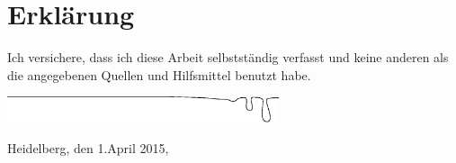 \onecolumn

\chapter*{Erkl\"{a}rung}

Ich versichere, dass ich diese Arbeit selbstst\"{a}ndig verfasst und keine anderen als die angegebenen Quellen und Hilfsmittel benutzt habe.

\vspace{2cm}
\hspace{4.5cm}
\includegraphics[width=0.6\textwidth]{./plot/sign_line.eps}

\vspace{-1.35cm}
Heidelberg, den 1.April 2015,

